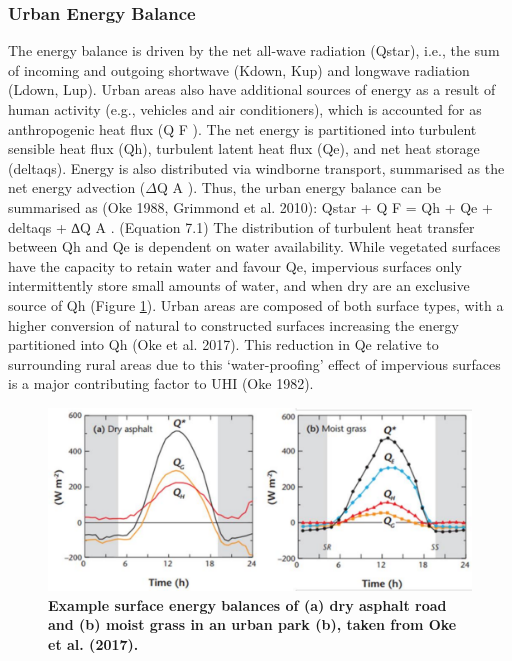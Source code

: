 \documentclass[final,3p,times,authoryear]{elsarticle}
\begin{document}
\subsubsection{Urban Energy Balance}\label{sec:appendix7.1.2.1}
The energy balance is driven by the net all-wave radiation (\gls{Qstar}), i.e., the sum of
incoming and outgoing shortwave (\gls{Kdown}, \gls{Kup}) and longwave radiation (\gls{Ldown}, \gls{Lup}). Urban areas also have additional sources of energy as a result of human activity (e.g., vehicles and air conditioners), which is accounted for as anthropogenic heat flux (Q F ).
The net energy is partitioned into turbulent sensible heat flux (\gls{Qh}), turbulent latent heat flux (\gls{Qe}), and net heat storage (\gls{deltaqs}). Energy is also distributed via windborne transport, summarised as the net energy advection ($\Delta$Q A ). Thus, the urban energy
balance can be summarised as (Oke 1988, Grimmond et al. 2010):
\gls{Qstar} + Q F = \gls{Qh} + \gls{Qe} + \gls{deltaqs} + ∆Q A .
(Equation 7.1)
The distribution of turbulent heat transfer between \gls{Qh} and \gls{Qe} is dependent on water
availability. While vegetated surfaces have the capacity to retain water and favour \gls{Qe},
impervious surfaces only intermittently store small amounts of water, and when dry are
an exclusive source of \gls{Qh} (Figure \ref{fig:7.1}). Urban areas are composed of both surface types,
with a higher conversion of natural to constructed surfaces increasing the energy
partitioned into \gls{Qh} (Oke et al. 2017). This reduction in \gls{Qe} relative to surrounding rural
areas due to this ‘water-proofing' effect of impervious surfaces is a major contributing
factor to UHI (Oke 1982).

\begin{figure}
\centering
\includegraphics[trim={0 0 0 0},clip,scale=1.0]{SEB.png}
\caption{\bf Example surface energy balances of (a) dry asphalt road and (b) moist grass in an urban
park (b), taken from Oke et al. (2017).}
 \label{fig:7.1}
\end{figure}
\end{document}
